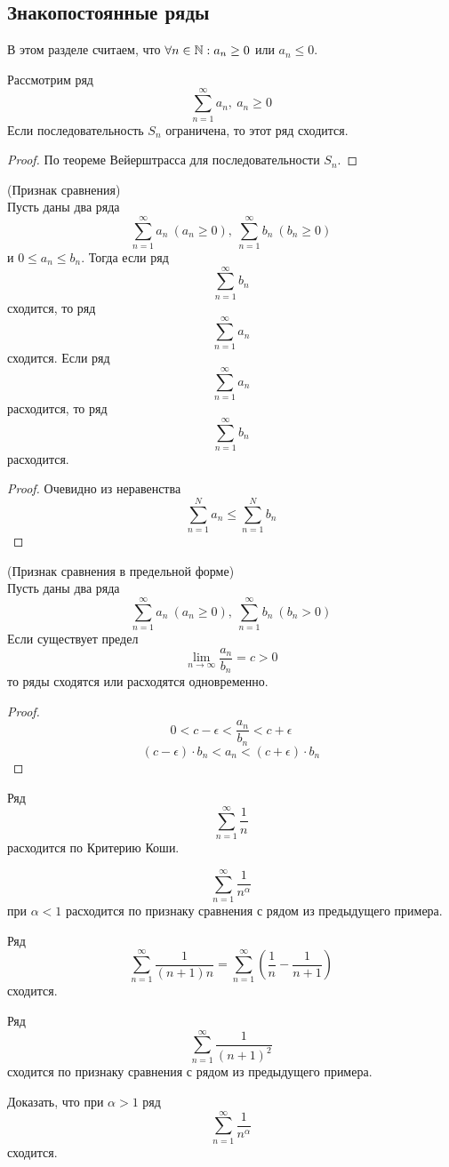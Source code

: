 \subsection{Знакопостоянные ряды}
В этом разделе считаем, что $\forall n\in \mathbb{N}: a_n\geq 0$ или $a_n\leq 0$.
\begin{theorem}
    Рассмотрим ряд
    \[\sum_{n=1}^{\infty}a_n,\ a_n\geq 0\]
    Если последовательность $S_n$ ограничена, то этот ряд сходится.
\end{theorem}
\begin{proof}
    По теореме Вейерштрасса для последовательности $S_n$.
\end{proof}
\begin{theorem} (Признак сравнения)\\
    Пусть даны два ряда
    \[\sum_{n=1}^{\infty}a_n\ (a_n\geq 0),\ \sum_{n=1}^{\infty}b_n\ (b_n\geq 0)\]
    и $0\leq a_n\leq b_n$. Тогда если ряд
    \[\sum_{n=1}^{\infty}b_n\]
    сходится, то ряд
    \[\sum_{n=1}^{\infty}a_n\]
    сходится. Если ряд
    \[\sum_{n=1}^{\infty}a_n\]
    расходится, то ряд
    \[\sum_{n=1}^{\infty}b_n\]
    расходится.
\end{theorem}
\begin{proof} Очевидно из неравенства
    \[\sum_{n=1}^{N}a_n\leq \sum_{n=1}^{N}b_n\]
\end{proof}
\begin{theorem} (Признак сравнения в предельной форме)\\
    Пусть даны два ряда
    \[\sum_{n=1}^{\infty}a_n\ (a_n\geq 0),\ \sum_{n=1}^{\infty}b_n\ (b_n > 0)\]
    Если существует предел
    \[\lim\limits_{n\to\infty}\frac{a_n}{b_n}=c>0\]
    то ряды сходятся или расходятся одновременно.
\end{theorem}
\begin{proof}
    \[0<c-\epsilon<\frac{a_n}{b_n}<c+\epsilon\]
    \[(c-\epsilon)\cdot b_n<a_n<(c+\epsilon)\cdot b_n\]
\end{proof}
\begin{example}
    Ряд
    \[\sum_{n=1}^{\infty}\frac{1}{n}\]
    расходится по Критерию Коши.
\end{example}
\begin{example}
    \[\sum_{n=1}^{\infty}\frac{1}{n^{\alpha}}\]
    при $\alpha<1$ расходится по признаку сравнения с рядом из предыдущего примера.
\end{example}
\begin{example} Ряд
    \[\sum_{n=1}^{\infty}\frac{1}{(n+1)n}=\sum_{n=1}^{\infty}\left(\frac{1}{n}-\frac{1}{n+1}\right)\]
    сходится.
\end{example}
\begin{example} Ряд
    \[\sum_{n=1}^{\infty}\frac{1}{(n+1)^2}\]
    сходится по признаку сравнения с рядом из предыдущего примера.
\end{example}
\begin{exercise} Доказать, что при $\alpha>1$ ряд
    \[\sum_{n=1}^{\infty}\frac{1}{n^{\alpha}}\]
    сходится.
\end{exercise}